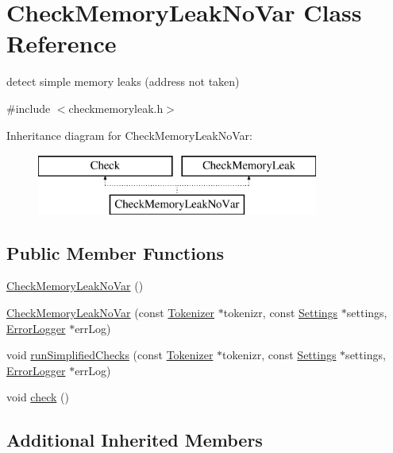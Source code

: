 \hypertarget{class_check_memory_leak_no_var}{\section{Check\-Memory\-Leak\-No\-Var Class Reference}
\label{class_check_memory_leak_no_var}
}


detect simple memory leaks (address not taken)  




{\ttfamily \#include $<$checkmemoryleak.\-h$>$}

Inheritance diagram for Check\-Memory\-Leak\-No\-Var\-:\begin{figure}[H]
\begin{center}
\leavevmode
\includegraphics[height=2.000000cm]{class_check_memory_leak_no_var}
\end{center}
\end{figure}
\subsection*{Public Member Functions}
\begin{DoxyCompactItemize}
\item 
\hyperlink{class_check_memory_leak_no_var_a538c7fbeac31d534dc9ee482e5878724}{Check\-Memory\-Leak\-No\-Var} ()
\item 
\hyperlink{class_check_memory_leak_no_var_a7a44d83d4778b1ff0c4c3dfb097cbfce}{Check\-Memory\-Leak\-No\-Var} (const \hyperlink{class_tokenizer}{Tokenizer} $\ast$tokenizr, const \hyperlink{class_settings}{Settings} $\ast$settings, \hyperlink{class_error_logger}{Error\-Logger} $\ast$err\-Log)
\item 
void \hyperlink{class_check_memory_leak_no_var_a1150c5130fee258d665b6ab9382c56ed}{run\-Simplified\-Checks} (const \hyperlink{class_tokenizer}{Tokenizer} $\ast$tokenizr, const \hyperlink{class_settings}{Settings} $\ast$settings, \hyperlink{class_error_logger}{Error\-Logger} $\ast$err\-Log)
\item 
void \hyperlink{class_check_memory_leak_no_var_a24f72812dcd24545458289daffe9fe5d}{check} ()
\end{DoxyCompactItemize}
\subsection*{Additional Inherited Members}



